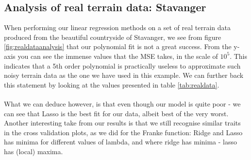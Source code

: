 \documentclass[../main.tex]{subfiles}
\begin{document}
\subsection{Analysis of real terrain data: Stavanger}
When performing our linear regression methods on a set of real terrain data produced from the beautiful countryside of Stavanger, we see from figure \eqref{fig:realdataanalysis} that our polynomial fit is not a great success. From the y-axis you can see the immense values that the MSE takes, in the scale of $10^5$. This indicates that a 5th order polynomial is practically useless to approximate such noisy terrain data as the one we have used in this example. We can further back this statement by looking at the values presented in table \eqref{tab:realdata}.  \\ \\\indent What we can deduce however, is that even though our model is quite poor - we can see that Lasso is the best fit for our data, albeit best of the very worst. Another interesting take from our results is that we still recognise similar traits in the cross validation plots, as we did for the Franke function: Ridge and Lasso has minima for different values of lambda, and where ridge has minima - lasso has (local) maxima.
\end{document}
